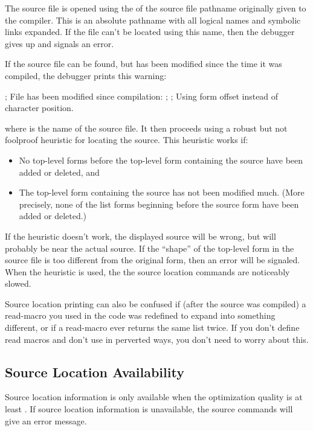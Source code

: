 The source file is opened using the  of the source file
pathname originally given to the compiler.  This is an absolute pathname
with all logical names and symbolic links expanded.  If the file can't
be located using this name, then the debugger gives up and signals an
error.

If the source file can be found, but has been modified since the time it was
compiled, the debugger prints this warning:
\begin{example}
; File has been modified since compilation:
;   
; Using form offset instead of character position.
\end{example}
where  is the name of the source file.  It then proceeds using a
robust but not foolproof heuristic for locating the source.  This heuristic
works if:
\begin{itemize}

\item
No top-level forms before the top-level form containing the source have been
added or deleted, and

\item
The top-level form containing the source has not been modified much.  (More
precisely, none of the list forms beginning before the source form have been
added or deleted.)
\end{itemize}

If the heuristic doesn't work, the displayed source will be wrong, but will
probably be near the actual source.  If the ``shape'' of the top-level form in
the source file is too different from the original form, then an error will be
signaled.  When the heuristic is used, the the source location commands are
noticeably slowed.

Source location printing can also be confused if (after the source was
compiled) a read-macro you used in the code was redefined to expand into
something different, or if a read-macro ever returns the same 
list twice.  If you don't define read macros and don't use \code{\#\#} in
perverted ways, you don't need to worry about this.


\subsection{Source Location Availability}

Source location information is only available when the 
optimization quality is at least .  If source location information is
unavailable, the source commands will give an error message.

